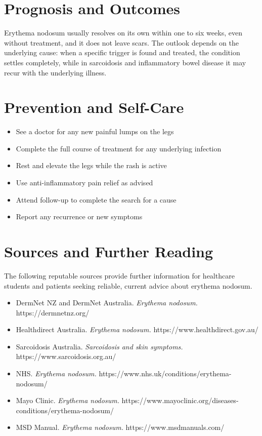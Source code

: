 \section*{Prognosis and Outcomes}
Erythema nodosum usually resolves on its own within one to six weeks, even without treatment, and it does not leave scars. The outlook depends on the underlying cause: when a specific trigger is found and treated, the condition settles completely, while in sarcoidosis and inflammatory bowel disease it may recur with the underlying illness.

\section*{Prevention and Self-Care}
\begin{itemize}
    \item See a doctor for any new painful lumps on the legs
    \item Complete the full course of treatment for any underlying infection
    \item Rest and elevate the legs while the rash is active
    \item Use anti-inflammatory pain relief as advised
    \item Attend follow-up to complete the search for a cause
    \item Report any recurrence or new symptoms
\end{itemize}

\section*{Sources and Further Reading}
The following reputable sources provide further information for healthcare students and patients seeking reliable, current advice about erythema nodosum.
\begin{itemize}
    \item DermNet NZ and DermNet Australia. \textit{Erythema nodosum.} https://dermnetnz.org/
    \item Healthdirect Australia. \textit{Erythema nodosum.} https://www.healthdirect.gov.au/
    \item Sarcoidosis Australia. \textit{Sarcoidosis and skin symptoms.} https://www.sarcoidosis.org.au/
    \item NHS. \textit{Erythema nodosum.} https://www.nhs.uk/conditions/erythema-nodosum/
    \item Mayo Clinic. \textit{Erythema nodosum.} https://www.mayoclinic.org/diseases-conditions/erythema-nodosum/
    \item MSD Manual. \textit{Erythema nodosum.} https://www.msdmanuals.com/
\end{itemize}
